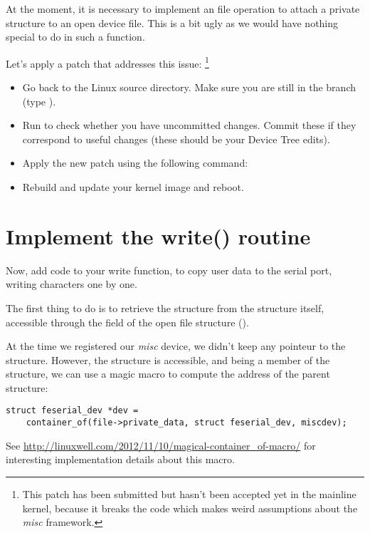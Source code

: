 At the moment, it is necessary to implement an  file
operation to attach a private structure to an open device file. This is
a bit ugly as we would have nothing special to do in such a function.

Let's apply a patch that addresses this issue:
\footnote{This patch has been submitted but hasn't been accepted yet in
the mainline kernel, because it breaks the  code which makes 
weird assumptions about the {\em misc} framework.}

\begin{itemize}
\item Go back to the Linux source directory. Make sure you are still in
      the  branch (type ).
\item Run  to check whether you have uncommitted
      changes. Commit these if they correspond to useful changes (these 
      should be your Device Tree edits).
\item Apply the new patch using the following command:
\item Rebuild and update your kernel image and reboot.
\end{itemize}

\section{Implement the write() routine}

Now, add code to your write function, to copy user data to the serial
port, writing characters one by one.

The first thing to do is to retrieve the  structure
from the  structure itself, accessible through the
 field of the open file structure ().

At the time we registered our {\em misc} device, we didn't keep any
pointeur to the  structure. However, the
 structure is accessible, and being a member of the
 structure, we can use a magic macro to compute
the address of the parent structure:

\begin{verbatim}
struct feserial_dev *dev =
	container_of(file->private_data, struct feserial_dev, miscdev);
\end{verbatim}

See \url{http://linuxwell.com/2012/11/10/magical-container_of-macro/}
for interesting implementation details about this macro.

